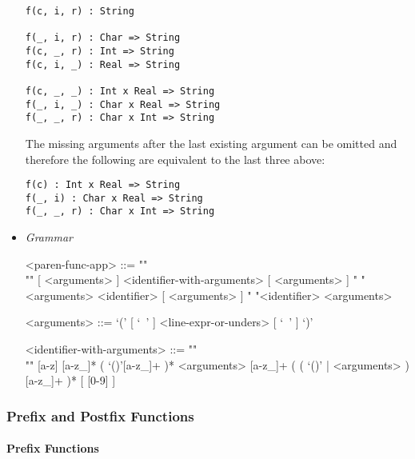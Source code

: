 \documentclass{article}
\begin{document}
\begin{itemize}
\begin{verbatim}
f(c, i, r) : String

f(_, i, r) : Char => String
f(c, _, r) : Int => String
f(c, i, _) : Real => String

f(c, _, _) : Int x Real => String
f(_, i, _) : Char x Real => String
f(_, _, r) : Char x Int => String
\end{verbatim}

The missing arguments after the last existing argument can be omitted and
therefore the following are equivalent to the last three above:

\begin{verbatim}
f(c) : Int x Real => String
f(_, i) : Char x Real => String
f(_, _, r) : Char x Int => String
\end{verbatim}

\item \textit{Grammar}
\begin{grammar}
<paren-func-app> ::= ""\\""
[ <arguments> ] <identifier-with-arguments> [ <arguments> ]
\alt " "<arguments> <identifier> [ <arguments> ]
\alt " "<identifier> <arguments>

<arguments> ::= `(' [ `\ ' ] <line-expr-or-unders> [ `\ ' ] `)'

<identifier-with-arguments> ::= ""\\""
[a-z] [a-z_]* ( `()'[a-z_]+ )* <arguments>
[a-z_]+ ( ( `()' | <arguments> ) [a-z_]+ )* 
[ [0-9] ]
\end{grammar}

\end{itemize}

\newpage

\subsubsection{Prefix and Postfix Functions}
 
\paragraph{Prefix Functions}
\end{document}
